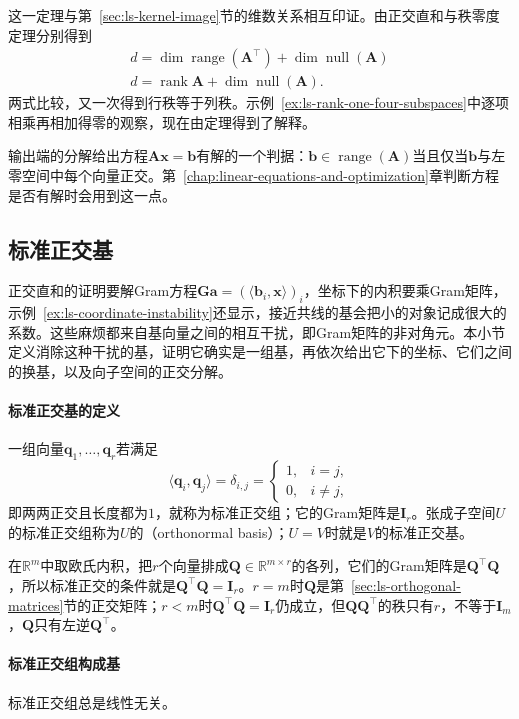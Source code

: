 这一定理与第~\ref{sec:ls-kernel-image}节的维数关系相互印证。由正交直和与秩零度定理分别得到
\[
 \begin{gathered}
d=\dim\operatorname{range}(\bm A^\top)+\dim\operatorname{null}(\bm A)\\
d=\operatorname{rank}\bm A+\dim\operatorname{null}(\bm A).
 \end{gathered}
\]
两式比较，又一次得到行秩等于列秩。示例~\ref{ex:ls-rank-one-four-subspaces}中逐项相乘再相加得零的观察，现在由定理得到了解释。

输出端的分解给出方程$\bm A\bm x=\bm b$有解的一个判据：$\bm b\in\operatorname{range}(\bm A)$当且仅当$\bm b$与左零空间中每个向量正交。第~\ref{chap:linear-equations-and-optimization}章判断方程是否有解时会用到这一点。

\subsection{标准正交基}
\label{sec:ls-orthonormal-bases}

正交直和的证明要解Gram方程$\bm G\bm a=(\langle\bm b_i,\bm x\rangle)_i$，坐标下的内积要乘Gram矩阵，示例~\ref{ex:ls-coordinate-instability}还显示，接近共线的基会把小的对象记成很大的系数。这些麻烦都来自基向量之间的相互干扰，即Gram矩阵的非对角元。本小节定义消除这种干扰的基，证明它确实是一组基，再依次给出它下的坐标、它们之间的换基，以及向子空间的正交分解。

\paragraph{标准正交基的定义}
一组向量$\bm q_1,\ldots,\bm q_r$若满足
\[
 \langle\bm q_i,\bm q_j\rangle=\delta_{i,j}=\begin{cases}1,&i=j,\\0,&i\neq j,\end{cases}
\]
即两两正交且长度都为$1$，就称为标准正交组；它的Gram矩阵是$\bm I_r$。张成子空间$U$的标准正交组称为$U$的（orthonormal basis）；$U=V$时就是$V$的标准正交基。

在$\mathbb R^m$中取欧氏内积，把$r$个向量排成$\bm Q\in\mathbb R^{m\times r}$的各列，它们的Gram矩阵是$\bm Q^\top\bm Q$，所以标准正交的条件就是$\bm Q^\top\bm Q=\bm I_r$。$r=m$时$\bm Q$是第~\ref{sec:ls-orthogonal-matrices}节的正交矩阵；$r<m$时$\bm Q^\top\bm Q=\bm I_r$仍成立，但$\bm Q\bm Q^\top$的秩只有$r$，不等于$\bm I_m$，$\bm Q$只有左逆$\bm Q^\top$。

\paragraph{标准正交组构成基}
标准正交组总是线性无关。

